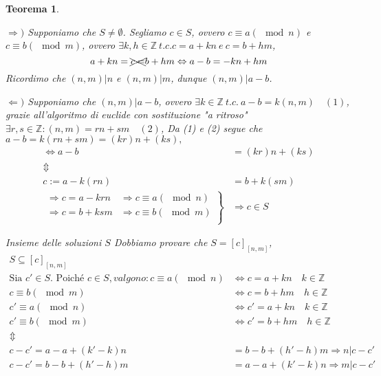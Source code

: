 \documentclass{article}
\makeatletter
\renewenvironment{proof}[1][\proofname]{\par
    \pushQED{\qed}%
    \normalfont \topsep6\p@\@plus6\p@\relax
    \trivlist
    \item\relax
    {\itshape
    #1\@addpunct{.}}\hspace\labelsep\ignorespaces
    }{%
    \popQED\endtrivlist\@endpefalse
}
\newtheorem{theorem}{Teorema}[part]
\theoremstyle{definition}
\newcommand{\Z}{\mathbb{Z}}
\makeatother
\begin{document}
\begin{theorem}
\begin{proof}
        \item{$\Rightarrow)$} Supponiamo che \(S\neq \emptyset\). Segliamo \(c\in S\), ovvero \(c\equiv a(\mod n)\) e \(c\equiv b(\mod m)\), ovvero \(\exists k,h\in\Z\ t.c. c=a+kn\ e\ c=b+hm\),
        \[
            a+kn=\xcancel{c=}b+hm \Leftrightarrow a-b=-kn+hm\\
        \]
        Ricordimo che \((n,m)|n\) e \((n,m)|m\), dunque \((n,m)|a-b\).
        \item{$\Leftarrow)$} Supponiamo che \((n,m)|a-b\), ovvero \(\exists k\in\Z \ t.c. \ a-b=k(n,m)\quad (1) \), grazie all'algoritmo di euclide con sostituzione "a ritroso" \(\exists r,s \in\Z: (n,m)=rn+sm\quad (2)\), Da (1) e (2) segue che \(a-b=k(rn+sm)=(kr)n+(ks),\)
        \[
            \begin{aligned}
                \Leftrightarrow a-b&=(kr)n+(ks)\\
                \Updownarrow\\
                c:= a-k(rn)&=b+k(sm)\\
                \left.\begin{aligned}
                    \Rightarrow c=a-krn &\Rightarrow c\equiv a(\mod n)\\
                    \Rightarrow c=b+ksm &\Rightarrow c\equiv b(\mod m)\\
                \end{aligned}\right\} &\Rightarrow c\in S
            \end{aligned}
        \]
        \item{Insieme delle soluzioni $S$} Dobbiamo provare che \(S=[c]_{[n,m]}\),
        \[
            \begin{aligned}
                S\subseteq [c]_{[n,m]}\\
                \text{Sia } c'\in S.\text{ Poiché } c\in S, valgono:
                c\equiv a(\mod n )&\Leftrightarrow c=a+kn\quad k\in\Z\\
                c\equiv b(\mod m )&\Leftrightarrow c=b+hm\quad h\in\Z\\
                c'\equiv a(\mod n )&\Leftrightarrow c'=a+kn\quad k\in\Z\\
                c'\equiv b(\mod m )&\Leftrightarrow c'=b+hm\quad h\in\Z\\
                \Updownarrow\\
                c-c'=a-a+(k'-k)n&=b-b+(h'-h)m \Rightarrow n|c-c'\\
                c-c'=b-b+(h'-h)m&=a-a+(k'-k)n \Rightarrow m|c-c'\\

\end{aligned}\]
\end{proof}
\end{theorem}
\end{document}
